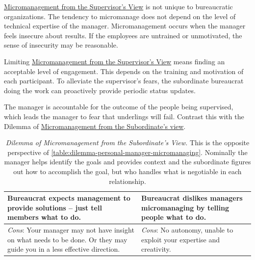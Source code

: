 \hyperref[table:dilemma-personal-manager-micromanaging]{Micromanagement from the Supervisor's View} 
\iftoggle{printedonpaper}{ (\ref{table:dilemma-personal-manager-micromanaging})}{} is 
not unique to bureaucratic organizations. The tendency to micromanage does not depend on the level of technical expertise of the manager. Micromanagement occurs when the manager feels insecure about results. If the employees are untrained or unmotivated, the sense of insecurity may be reasonable.

Limiting \hyperref[table:dilemma-personal-manager-micromanaging]{Micromanagement from the Supervisor's View} means finding an acceptable level of engagement. This depends on the training and motivation of each participant. To alleviate the supervisor's fears, the subordinate bureaucrat doing the work can proactively provide periodic status updates. 

The manager is accountable for the outcome of the people being supervised, which leads the manager to fear that underlings will fail.  Contrast this with the Dilemma of  \hyperref[table:dilemma-personal-solution-provider]{Micromanagement from the Subordinate's view}.

\begin{center}
\begin{table}[H] %
\begin{tabular}{ | m{\dilemmatablewidth}| m{\dilemmatablewidth} | } 
  \hline
  \textbf{Bureaucrat expects management to provide solutions -- just tell members what to do.} & 
  \textbf{Bureaucrat dislikes managers micromanaging by telling people what to do.} \\ 
  \hline
  \textit{Cons}: Your manager may not have insight on what needs to be done. Or they may guide you in a less effective direction. &
  \textit{Cons}: No autonomy, unable to exploit your expertise and creativity. \\  
  \hline
\end{tabular}
\caption{\textit{Dilemma of Micromanagement from the Subordinate's View.}
This is the opposite perspective of \ref{table:dilemma-personal-manager-micromanaging}. Nominally the manager helps identify the goals and provides context and the subordinate figures out how to accomplish the goal, but who handles what is negotiable in each relationship.
}
\label{table:dilemma-personal-solution-provider}
\end{table}
\end{center}

